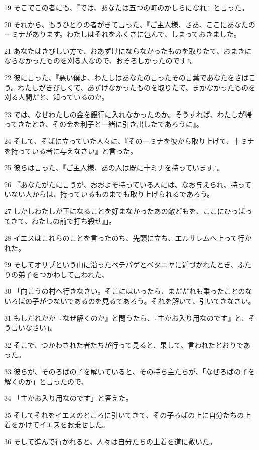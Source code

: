 \par 19 そこでこの者にも、『では、あなたは五つの町のかしらになれ』と言った。
\par 20 それから、もうひとりの者がきて言った、『ご主人様、さあ、ここにあなたの一ミナがあります。わたしはそれをふくさに包んで、しまっておきました。
\par 21 あなたはきびしい方で、おあずけにならなかったものを取りたて、おまきにならなかったものを刈る人なので、おそろしかったのです』。
\par 22 彼に言った、『悪い僕よ、わたしはあなたの言ったその言葉であなたをさばこう。わたしがきびしくて、あずけなかったものを取りたて、まかなかったものを刈る人間だと、知っているのか。
\par 23 では、なぜわたしの金を銀行に入れなかったのか。そうすれば、わたしが帰ってきたとき、その金を利子と一緒に引き出したであろうに』。
\par 24 そして、そばに立っていた人々に、『その一ミナを彼から取り上げて、十ミナを持っている者に与えなさい』と言った。
\par 25 彼らは言った、『ご主人様、あの人は既に十ミナを持っています』。
\par 26 『あなたがたに言うが、おおよそ持っている人には、なお与えられ、持っていない人からは、持っているものまでも取り上げられるであろう。
\par 27 しかしわたしが王になることを好まなかったあの敵どもを、ここにひっぱってきて、わたしの前で打ち殺せ』」。
\par 28 イエスはこれらのことを言ったのち、先頭に立ち、エルサレムへ上って行かれた。
\par 29 そしてオリブという山に沿ったベテパゲとベタニヤに近づかれたとき、ふたりの弟子をつかわして言われた、
\par 30 「向こうの村へ行きなさい。そこにはいったら、まだだれも乗ったことのないろばの子がつないであるのを見るであろう。それを解いて、引いてきなさい。
\par 31 もしだれかが『なぜ解くのか』と問うたら、『主がお入り用なのです』と、そう言いなさい」。
\par 32 そこで、つかわされた者たちが行って見ると、果して、言われたとおりであった。
\par 33 彼らが、そのろばの子を解いていると、その持ち主たちが、「なぜろばの子を解くのか」と言ったので、
\par 34 「主がお入り用なのです」と答えた。
\par 35 そしてそれをイエスのところに引いてきて、その子ろばの上に自分たちの上着をかけてイエスをお乗せした。
\par 36 そして進んで行かれると、人々は自分たちの上着を道に敷いた。
